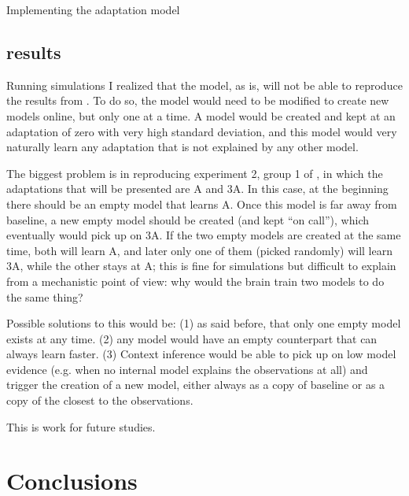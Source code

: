 \documentclass{report}
\begin{document}
\begin{chapter}{Implementing the adaptation model}
\subsection{\cite{Davidson_Scaling_2004} results}
Running simulations I realized that the model, as is, will not be able to
reproduce the results from \cite{Davidson_Scaling_2004}. To do so, the model
would need to be modified to create new models online, but only one at a
time. A model would be created and kept at an adaptation of zero with very high
standard deviation, and this model would very naturally learn any adaptation
that is not explained by any other model.

The biggest problem is in reproducing experiment 2, group 1 of
\cite{Davidson_Scaling_2004}, in which the adaptations that will be presented
are A and 3A. In this case, at the beginning there should be an empty model
that learns A. Once this model is far away from baseline, a new empty model
should be created (and kept ``on call''), which eventually would pick up on
3A. If the two empty models are created at the same time, both will learn A,
and later only one of them (picked randomly) will learn 3A, while the other
stays at A; this is fine for simulations but difficult to explain from a
mechanistic point of view: why would the brain train two models to do the same
thing?

Possible solutions to this would be: (1) as said before, that only one empty
model exists at any time. (2) any model would have an empty counterpart that
can always learn faster. (3) Context inference would be able to pick up on low
model evidence (e.g. when no internal model explains the observations at all)
and trigger the creation of a new model, either always as a copy of baseline or
as a copy of the closest to the observations.

This is work for future studies.

\section{Conclusions}



\end{chapter}







\end{document}
